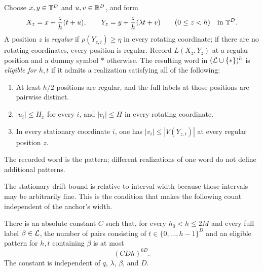 \begin{definition}\label{count:eligible}
Choose $x,y\in\mathbb T^D$ and $u,v\in\mathbb R^D$, and form
\begin{equation}\label{count:local-paths}
 X_z=x+\frac z h(t+u),\qquad
 Y_z=y+\frac z h(\lambda t+v)\qquad(0\le z<h)
 \quad\text{in }\mathbb T^D.
\end{equation}
A position $z$ is \emph{regular} if
$\rho(Y_{z,i})\ge\eta$ in every rotating coordinate; if there are
no rotating coordinates, every position is regular. Record
$L(X_z,Y_z)$ at a regular position and a dummy symbol $*$ otherwise.
The resulting word in $(\mathcal L\cup\{*\})^h$ is \emph{eligible for
$h,t$} if it admits a realization satisfying all of the following:
\begin{enumerate}[label=\textup{(\roman*)}]
 \item At least $h/2$ positions are regular, and the full labels at
       those positions are pairwise distinct.
 \item $|u_i|\le H_x$ for every $i$, and $|v_i|\le H$ in every
       rotating coordinate.
 \item In every stationary coordinate $i$, one has
       $|v_i|\le |V(Y_{z,i})|$ at every regular position $z$.
\end{enumerate}
The recorded word is the pattern; different realizations of one word
do not define additional patterns.
\end{definition}

The stationary drift bound is relative to interval width because those
intervals may be arbitrarily fine. This is the condition that makes
the following count independent of the anchor's width.

\begin{lemma}\label{count:local}
There is an absolute constant $C$ such that, for every
$h_0<h\le2M$ and every full label $\beta\in\mathcal L$, the number of pairs
consisting of $t\in\{0,\ldots,h-1\}^D$ and an eligible pattern for
$h,t$ containing $\beta$ is at most
\begin{equation}\label{count:local-bound}
 (CDh)^{6D}.
\end{equation}
The constant is independent of $q$, $\lambda$, $\beta$, and $D$.
\end{lemma}

